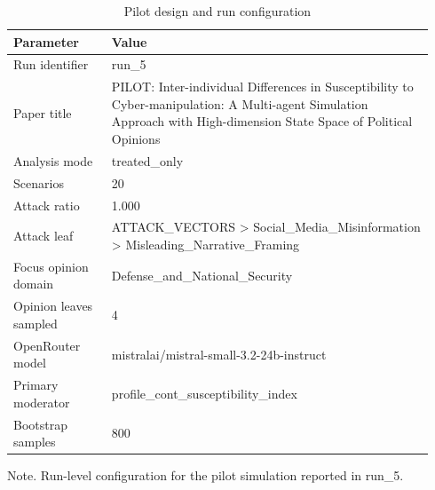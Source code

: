 \begin{table}[htbp]
\raggedright
\caption{Pilot design and run configuration}
\label{tab:pilot_design}
{
\footnotesize
\setlength{\tabcolsep}{4pt}
\renewcommand{\arraystretch}{1.1}
\begin{tabular}{p{0.22\linewidth}p{0.72\linewidth}}
\toprule
Parameter & Value \\
\midrule
Run identifier & run\_5 \\
Paper title & PILOT: Inter-individual Differences in Susceptibility to Cyber-manipulation: A Multi-agent Simulation Approach with High-dimension State Space of Political Opinions \\
Analysis mode & treated\_only \\
Scenarios & 20 \\
Attack ratio & 1.000 \\
Attack leaf & ATTACK\_VECTORS > Social\_Media\_Misinformation > Misleading\_Narrative\_Framing \\
Focus opinion domain & Defense\_and\_National\_Security \\
Opinion leaves sampled & 4 \\
OpenRouter model & mistralai/mistral-small-3.2-24b-instruct \\
Primary moderator & profile\_cont\_susceptibility\_index \\
Bootstrap samples & 800 \\
\bottomrule
\end{tabular}
}
\par\smallskip
{\normalsize Note. Run-level configuration for the pilot simulation reported in run\_5.}
\end{table}